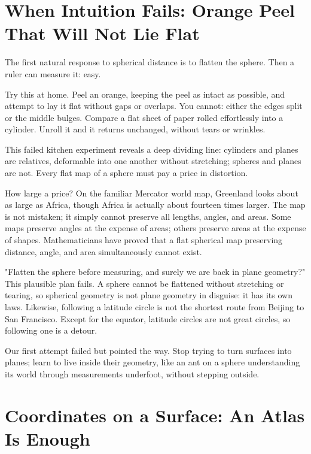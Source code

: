 \section{When Intuition Fails: Orange Peel That Will Not Lie Flat}

The first natural response to spherical distance is to flatten the sphere. Then a ruler can measure it: easy.

Try this at home. Peel an orange, keeping the peel as intact as possible, and attempt to lay it flat without gaps or overlaps. You cannot: either the edges split or the middle bulges. Compare a flat sheet of paper rolled effortlessly into a cylinder. Unroll it and it returns unchanged, without tears or wrinkles.

This failed kitchen experiment reveals a deep dividing line: cylinders and planes are relatives, deformable into one another without stretching; spheres and planes are not. Every flat map of a sphere must pay a price in distortion.

How large a price? On the familiar Mercator world map, Greenland looks about as large as Africa, though Africa is actually about fourteen times larger. The map is not mistaken; it simply cannot preserve all lengths, angles, and areas. Some maps preserve angles at the expense of areas; others preserve areas at the expense of shapes. Mathematicians have proved that a flat spherical map preserving distance, angle, and area simultaneously cannot exist.

\begin{fanli}
"Flatten the sphere before measuring, and surely we are back in plane geometry?" This plausible plan fails. A sphere cannot be flattened without stretching or tearing, so spherical geometry is not plane geometry in disguise: it has its own laws. Likewise, following a latitude circle is not the shortest route from Beijing to San Francisco. Except for the equator, latitude circles are not great circles, so following one is a detour.
\end{fanli}

Our first attempt failed but pointed the way. Stop trying to turn surfaces into planes; learn to live inside their geometry, like an ant on a sphere understanding its world through measurements underfoot, without stepping outside.

\section{Coordinates on a Surface: An Atlas Is Enough}

